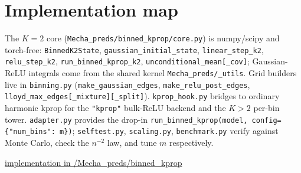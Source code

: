 \documentclass[11pt]{article}
\begin{document}
\section{Implementation map}

The $K=2$ core (\texttt{Mecha\_preds/binned\_kprop/core.py}) is numpy/scipy and torch-free: \texttt{BinnedK2State}, \texttt{gaussian\_initial\_state}, \texttt{linear\_step\_k2}, \texttt{relu\_step\_k2}, \texttt{run\_binned\_kprop\_k2}, \texttt{unconditional\_mean[\_cov]}; Gaussian-ReLU integrals come from the shared kernel \texttt{Mecha\_preds/\_utils}. Grid builders live in \texttt{binning.py} (\texttt{make\_gaussian\_edges}, \texttt{make\_relu\_post\_edges}, \texttt{lloyd\_max\_edges[\_mixture][\_split]}). \texttt{kprop\_hook.py} bridges to ordinary harmonic kprop for the \texttt{"kprop"} bulk-ReLU backend and the $K > 2$ per-bin tower. \texttt{adapter.py} provides the drop-in \texttt{run\_binned\_kprop(model, config=\{"num\_bins": m\})}; \texttt{selftest.py}, \texttt{scaling.py}, \texttt{benchmark.py} verify against Monte Carlo, check the $n^{-2}$ law, and tune $m$ respectively.

\href{https://github.com/Tewoto1/Output-estimation-for-one-trained-model.git}{implementation in /Mecha\_preds/binned\_kprop}
\end{document}

